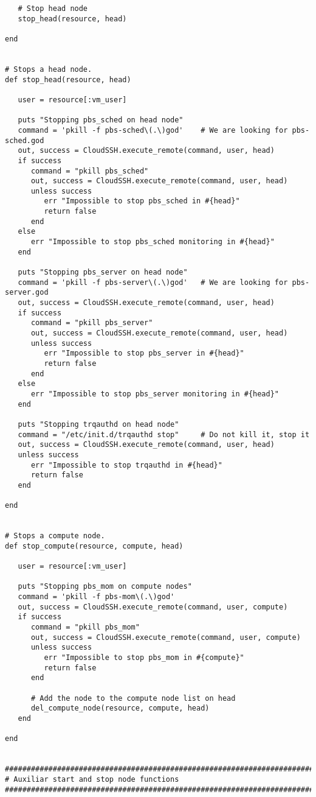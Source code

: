 \begin{lstlisting}
   # Stop head node
   stop_head(resource, head)
   
end


# Stops a head node.
def stop_head(resource, head)
   
   user = resource[:vm_user]
   
   puts "Stopping pbs_sched on head node"
   command = 'pkill -f pbs-sched\(.\)god'    # We are looking for pbs-sched.god
   out, success = CloudSSH.execute_remote(command, user, head)
   if success
      command = "pkill pbs_sched"
      out, success = CloudSSH.execute_remote(command, user, head)
      unless success
         err "Impossible to stop pbs_sched in #{head}"
         return false
      end
   else
      err "Impossible to stop pbs_sched monitoring in #{head}"
   end
   
   puts "Stopping pbs_server on head node"
   command = 'pkill -f pbs-server\(.\)god'   # We are looking for pbs-server.god
   out, success = CloudSSH.execute_remote(command, user, head)
   if success
      command = "pkill pbs_server"
      out, success = CloudSSH.execute_remote(command, user, head)
      unless success
         err "Impossible to stop pbs_server in #{head}"
         return false
      end
   else
      err "Impossible to stop pbs_server monitoring in #{head}"
   end
   
   puts "Stopping trqauthd on head node"
   command = "/etc/init.d/trqauthd stop"     # Do not kill it, stop it
   out, success = CloudSSH.execute_remote(command, user, head)
   unless success
      err "Impossible to stop trqauthd in #{head}"
      return false
   end

end


# Stops a compute node.
def stop_compute(resource, compute, head)

   user = resource[:vm_user]

   puts "Stopping pbs_mom on compute nodes"
   command = 'pkill -f pbs-mom\(.\)god'
   out, success = CloudSSH.execute_remote(command, user, compute)
   if success
      command = "pkill pbs_mom"
      out, success = CloudSSH.execute_remote(command, user, compute)
      unless success
         err "Impossible to stop pbs_mom in #{compute}"
         return false
      end
      
      # Add the node to the compute node list on head
      del_compute_node(resource, compute, head)
   end

end


################################################################################
# Auxiliar start and stop node functions
################################################################################


\end{lstlisting}

